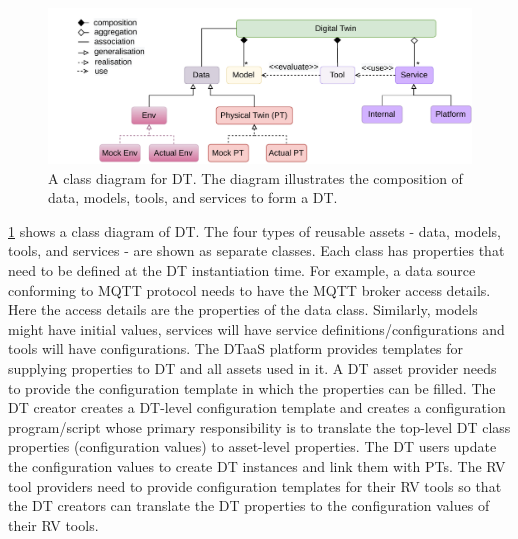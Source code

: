 %
\begin{figure}[]
	\centering
	\includegraphics[width=1.0\textwidth]{images/assets-relationship.pdf}
	\caption{A class diagram for DT. The diagram illustrates the composition of data, models, tools, and services to form a DT.}
	\label{fig:dt-class-diagram}
\end{figure}%
%
\cref{fig:dt-class-diagram} shows a class diagram of DT. The four types of reusable assets - data, models, tools, and services - are shown as separate classes. Each class has properties that need to be defined at the DT instantiation time. For example, a data source conforming to MQTT protocol needs to have the MQTT broker access details. Here the access details are the properties of the data class. Similarly, models might have initial values, services will have service definitions/configurations and tools will have configurations. The DTaaS platform provides templates for supplying properties to DT and all assets used in it. A DT asset provider needs to provide the configuration template in which the properties can be filled.
The DT creator creates a DT-level configuration template and creates a configuration program/script whose primary responsibility is to translate the top-level DT class properties (configuration values) to asset-level properties. The DT users update the configuration values to create DT instances and link them with PTs.
The RV tool providers need to provide configuration templates for their RV tools so that the DT creators can translate the DT properties to the configuration values of their RV tools.

